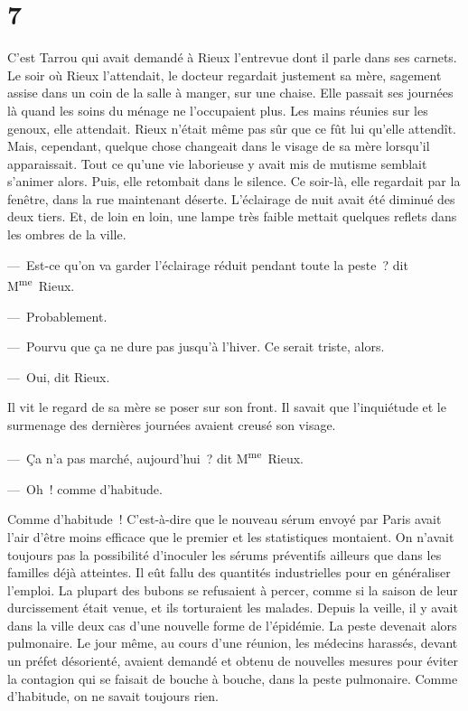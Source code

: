 \documentclass[french,twoside]{book} %
\begin{document}
\section[{7}]{7}
\noindent C’est Tarrou qui avait demandé à Rieux l’entrevue dont il parle dans ses carnets. Le soir où Rieux l’attendait, le docteur regardait justement sa mère, sagement assise dans un coin de la salle à manger, sur une chaise. Elle passait ses journées là quand les soins du ménage ne l’occupaient plus. Les mains réunies sur les genoux, elle attendait. Rieux n’était même pas sûr que ce fût lui qu’elle attendît. Mais, cependant, quelque chose changeait dans le visage de sa mère lorsqu’il apparaissait. Tout ce qu’une vie laborieuse y avait mis de mutisme semblait s’animer alors. Puis, elle retombait dans le silence. Ce soir-là, elle regardait par la fenêtre, dans la rue maintenant déserte. L’éclairage de nuit avait été diminué des deux tiers. Et, de loin en loin, une lampe très faible mettait quelques reflets dans les ombres de la ville.\par
— Est-ce qu’on va garder l’éclairage réduit pendant toute la peste ? dit M\textsuperscript{me} Rieux.\par
— Probablement.\par
— Pourvu que ça ne dure pas jusqu’à l’hiver. Ce serait triste, alors.\par
— Oui, dit Rieux.\par
Il vit le regard de sa mère se poser sur son front. Il savait que l’inquiétude et le surmenage des dernières journées avaient creusé son visage.\par
— Ça n’a pas marché, aujourd’hui ? dit M\textsuperscript{me} Rieux.\par
— Oh ! comme d’habitude.\par
Comme d’habitude ! C’est-à-dire que le nouveau sérum envoyé par Paris avait l’air d’être moins efficace que le premier et les statistiques montaient. On n’avait toujours pas la possibilité d’inoculer les sérums préventifs ailleurs que dans les familles déjà atteintes. Il eût fallu des quantités industrielles pour en généraliser l’emploi. La plupart des bubons se refusaient à percer, comme si la saison de leur durcissement était venue, et ils torturaient les malades. Depuis la veille, il y avait dans la ville deux cas d’une nouvelle forme de l’épidémie. La peste devenait alors pulmonaire. Le jour même, au cours d’une réunion, les médecins harassés, devant un préfet désorienté, avaient demandé et obtenu de nouvelles mesures pour éviter la contagion qui se faisait de bouche à bouche, dans la peste pulmonaire. Comme d’habitude, on ne savait toujours rien.\par
\end{document}
